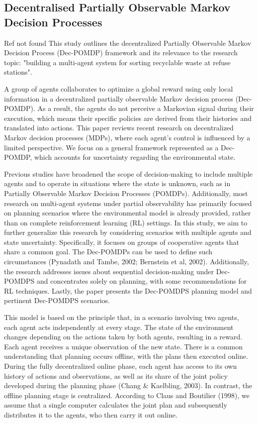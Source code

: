 
\subsection{Decentralised Partially Observable Markov Decision Processes}
\label{sub:lit-rev_dec-pomdp}

Ref not found
This study outlines the decentralized Partially Observable Markov Decision Process (Dec-POMDP) framework and its relevance to the research topic: "building a multi-agent system for sorting recyclable waste at refuse stations".


A group of agents collaborates to optimize a global reward using only local information in a decentralized partially observable Markov decision process (Dec-POMDP). As a result, the agents do not perceive a Markovian signal during their execution, which means their specific policies are derived from their histories and translated into actions. This paper reviews recent research on decentralized Markov decision processes (MDPs), where each agent's control is influenced by a limited perspective. We focus on a general framework represented as a Dec-POMDP, which accounts for uncertainty regarding the environmental state.


Previous studies have broadened the scope of decision-making to include multiple agents and to operate in situations where the state is unknown, such as in Partially Observable Markov Decision Processes (POMDPs). Additionally, most research on multi-agent systems under partial observability has primarily focused on planning scenarios where the environmental model is already provided, rather than on complete reinforcement learning (RL) settings. In this study, we aim to further generalize this research by considering scenarios with multiple agents and state uncertainty. Specifically, it focuses on groups of cooperative agents that share a common goal. The Dec-POMDPs can be used to define such circumstances (Pynadath and Tambe, 2002; Bernstein et al, 2002).  Additionally, the research addresses issues about sequential decision-making under Dec-POMDPS and concentrates solely on planning, with some recommendations for RL techniques. Lastly, the paper presents the Dec-POMDPS planning model and pertinent Dec-POMDPS scenarios.

This model is based on the principle that, in a scenario involving two agents, each agent acts independently at every stage. The state of the environment changes depending on the actions taken by both agents, resulting in a reward. Each agent receives a unique observation of the new state. There is a common understanding that planning occurs offline, with the plans then executed online. During the fully decentralized online phase, each agent has access to its own history of actions and observations, as well as its share of the joint policy developed during the planning phase (Chang & Kaelbling, 2003). In contrast, the offline planning stage is centralized. According to Claus and Boutilier (1998), we assume that a single computer calculates the joint plan and subsequently distributes it to the agents, who then carry it out online.

